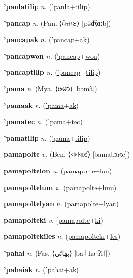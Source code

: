 \textbf{\hypertarget{'panlatilip}{'panlatilip}} \textit{n.} (\hyperlink{'panla}{'panla}+\allowbreak \hyperlink{tilip}{tilip})


\textbf{\hypertarget{'pancap}{'pancap}} \textit{n.} (Pan. ⟨{\gurmukhi{}ਪੰਜਾਬ}⟩ [pə̃d͡ʒɑːb])


\textbf{\hypertarget{'pancapak}{'pancapak}} \textit{n.} (\hyperlink{'pancap}{'pancap}+\allowbreak \hyperlink{ak}{ak})


\textbf{\hypertarget{'pancapwon}{'pancapwon}} \textit{n.} (\hyperlink{'pancap}{'pancap}+\allowbreak \hyperlink{won}{won})


\textbf{\hypertarget{'pancaptilip}{'pancaptilip}} \textit{n.} (\hyperlink{'pancap}{'pancap}+\allowbreak \hyperlink{tilip}{tilip})


\textbf{\hypertarget{'pama}{'pama}} \textit{n.} (Mya. ⟨{\myanmar{}ဗမာ}⟩ [bəmà])


\textbf{\hypertarget{'pamaak}{'pamaak}} \textit{n.} (\hyperlink{'pama}{'pama}+\allowbreak \hyperlink{ak}{ak})


\textbf{\hypertarget{'pamatec}{'pamatec}} \textit{n.} (\hyperlink{'pama}{'pama}+\allowbreak \hyperlink{tec}{tec})


\textbf{\hypertarget{'pamatilip}{'pamatilip}} \textit{n.} (\hyperlink{'pama}{'pama}+\allowbreak \hyperlink{tilip}{tilip})


\textbf{\hypertarget{pamapolte}{pamapolte}} \textit{v.} (Ben. ⟨{\bengali{}বামাবর্তে}⟩ [bamabɔrt̪e])


\textbf{\hypertarget{pamapoltelon}{pamapoltelon}} \textit{n.} (\hyperlink{pamapolte}{pamapolte}+\allowbreak \hyperlink{lon}{lon})


\textbf{\hypertarget{pamapoltelum}{pamapoltelum}} \textit{n.} (\hyperlink{pamapolte}{pamapolte}+\allowbreak \hyperlink{lum}{lum})


\textbf{\hypertarget{pamapoltelyan}{pamapoltelyan}} \textit{n.} (\hyperlink{pamapolte}{pamapolte}+\allowbreak \hyperlink{lyan}{lyan})


\textbf{\hypertarget{pamapolteki}{pamapolteki}} \textit{v.} (\hyperlink{pamapolte}{pamapolte}+\allowbreak \hyperlink{ki}{ki})


\textbf{\hypertarget{pamapoltekiles}{pamapoltekiles}} \textit{n.} (\hyperlink{pamapolteki}{pamapolteki}+\allowbreak \hyperlink{les}{les})


\textbf{\hypertarget{'pahai}{'pahai}} \textit{n.} (Fas. ⟨{\arabics{}بهائی‎}⟩ [ba˨ˈha˦ʔi˦])


\textbf{\hypertarget{'pahaiak}{'pahaiak}} \textit{n.} (\hyperlink{'pahai}{'pahai}+\allowbreak \hyperlink{ak}{ak})


